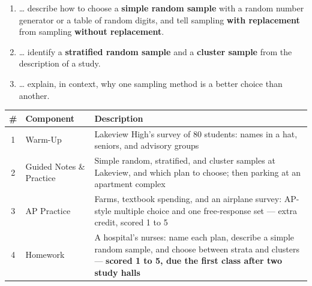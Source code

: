 \documentclass[12pt]{article}
\begin{document}

\namedateperiod
\vspace{0.18in}

\boxguard[14]
\begin{learningtargetbox}
\small
\begin{enumerate}[leftmargin=1.5em, itemsep=5pt]
  \item \ldots{} describe how to choose a \textbf{simple random sample} with a random number
        generator or a table of random digits, and tell sampling \textbf{with replacement}
        from sampling \textbf{without replacement}.
  \item \ldots{} identify a \textbf{stratified random sample} and a \textbf{cluster sample}
        from the description of a study.
  \item \ldots{} explain, in context, why one sampling method is a better choice than another.
\end{enumerate}
\end{learningtargetbox}

\vspace{0.14in}

\boxguard[14]
\begin{tocbox}
\small
\renewcommand{\arraystretch}{1.5}
\begin{tabularx}{\linewidth}{@{} c l X @{}}
\rowcolor{sky}
\textbf{\#} & \textbf{Component} & \textbf{Description} \\
\midrule
1 & Warm-Up & Lakeview High's survey of 80 students: names in a hat, seniors, and advisory
                 groups \\
2 & Guided Notes \& Practice & Simple random, stratified, and cluster samples at Lakeview, and
                 which plan to choose; then parking at an apartment complex \\
3 & AP Practice & Farms, textbook spending, and an airplane survey: AP-style multiple choice and
                 one free-response set --- extra credit, scored 1 to 5 \\
4 & Homework & A hospital's nurses: name each plan, describe a simple random sample, and choose
                 between strata and clusters --- \textbf{scored 1 to 5, due the first class after
                 two study halls} \\
\end{tabularx}
\end{tocbox}
\end{document}
